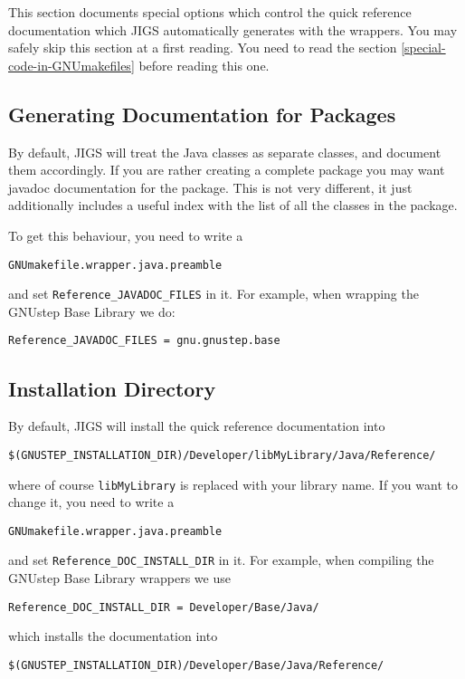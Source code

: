 This section documents special options which control the quick
reference documentation which JIGS automatically generates with the
wrappers.  You may safely skip this section at a first reading.  You
need to read the section \ref{special-code-in-GNUmakefiles} before
reading this one.

\subsection{Generating Documentation for Packages}
By default, JIGS will treat the Java classes as separate classes, and
document them accordingly.  If you are rather creating a complete
package you may want javadoc documentation for the package.  This is
not very different, it just additionally includes a useful index with 
the list of all the classes in the package.

To get this behaviour, you need to write a 
\begin{verbatim}
GNUmakefile.wrapper.java.preamble
\end{verbatim}
and set \texttt{Reference\_JAVADOC\_FILES} in it.  For example, when 
wrapping the GNUstep Base Library we do:
\begin{verbatim}
Reference_JAVADOC_FILES = gnu.gnustep.base
\end{verbatim}

\subsection{Installation Directory}
By default, JIGS will install the quick reference documentation into 
\begin{verbatim}
$(GNUSTEP_INSTALLATION_DIR)/Developer/libMyLibrary/Java/Reference/
\end{verbatim}%
where of course \texttt{libMyLibrary} is replaced with your library name.
If you want to change it, you need to write a 
\begin{verbatim}
GNUmakefile.wrapper.java.preamble
\end{verbatim}
and set \texttt{Reference\_DOC\_INSTALL\_DIR} in it.  For example, 
when compiling the GNUstep Base Library wrappers we use
\begin{verbatim}
Reference_DOC_INSTALL_DIR = Developer/Base/Java/
\end{verbatim}
which installs the documentation into
\begin{verbatim}
$(GNUSTEP_INSTALLATION_DIR)/Developer/Base/Java/Reference/
\end{verbatim}%


